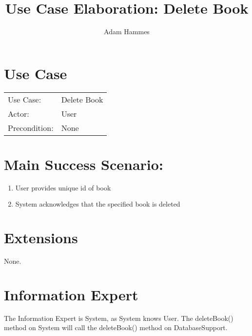 \documentclass{article}
\title{Use Case Elaboration: Delete Book}
\author{ Adam Hammes }
\begin{document}
\maketitle


\section*{Use Case}
\begin{tabular}{l l}
Use Case:     & Delete Book\\
Actor:        & User\\
Precondition: & None\\
\end{tabular}


\section*{Main Success Scenario:}

\begin{enumerate}
    \item User provides unique id of book
    \item System acknowledges that the specified book is deleted

\end{enumerate}

\section*{Extensions}

None.


\section*{Information Expert}

The Information Expert is System, as System knows User.
The deleteBook() method on System will call the deleteBook() method on DatabaseSupport.
\end{document}
